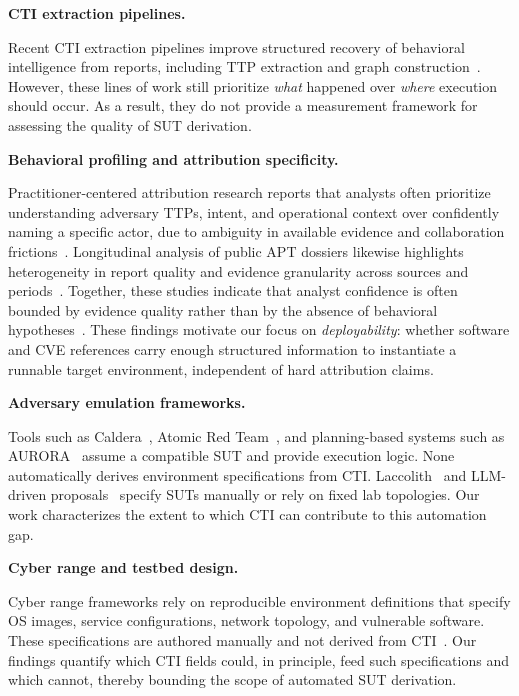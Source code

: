\documentclass[sigconf,anonymous,review]{acmart}
\newcommand{\caldera}{Caldera\xspace}
\newcommand{\myparagraph}[1]{\textbf{#1.}\hspace{0.5em}}
\begin{document}
\myparagraph{CTI extraction pipelines}

Recent CTI extraction pipelines improve structured recovery of behavioral intelligence from reports, including TTP extraction and graph construction~\cite{savat2021extractor,DBLP:journals/corr/abs-2412-10872,cheng2025ctinexus,DBLP:conf/uss/BuchelPLCZBE0GC25}. However, these lines of work still prioritize \emph{what} happened over \emph{where} execution should occur. As a result, they do not provide a measurement framework for assessing the quality of SUT derivation.

\myparagraph{Behavioral profiling and attribution specificity}

Practitioner-centered attribution research reports that analysts often prioritize understanding adversary TTPs, intent, and operational context over confidently naming a specific actor, due to ambiguity in available evidence and collaboration frictions~\cite{DBLP:conf/uss/SahaMBCVL25}. Longitudinal analysis of public APT dossiers likewise highlights heterogeneity in report quality and evidence granularity across sources and periods~\cite{DBLP:conf/ccs/YuldoshkhujaevJ25}. Together, these studies indicate that analyst confidence is often bounded by evidence quality rather than by the absence of behavioral hypotheses~\cite{DBLP:conf/uss/SahaMBCVL25,DBLP:conf/ccs/YuldoshkhujaevJ25}. These findings motivate our focus on \emph{deployability}: whether software and CVE references carry enough structured information to instantiate a runnable target environment, independent of hard attribution claims.

\myparagraph{Adversary emulation frameworks}

Tools such as \caldera{}~\cite{applebaum2016caldera}, Atomic Red Team~\cite{redcanary2023art}, and planning-based systems such as AURORA~\cite{wang2024sands} assume a compatible SUT and provide execution logic. None automatically derives environment specifications from CTI. Laccolith~\cite{orbinato2024laccolith} and LLM-driven proposals~\cite{singer2025incalmo,deng2024pentestgpt,shen2025pentestagent} specify SUTs manually or rely on fixed lab topologies. Our work characterizes the extent to which CTI can contribute to this automation gap.

\myparagraph{Cyber range and testbed design}

Cyber range frameworks rely on reproducible environment definitions that specify OS images, service configurations, network topology, and vulnerable software. These specifications are authored manually and not derived from CTI~\cite{orbinato2024laccolith,damodaran2025automated}. Our findings quantify which CTI fields could, in principle, feed such specifications and which cannot, thereby bounding the scope of automated SUT derivation.
\end{document}
